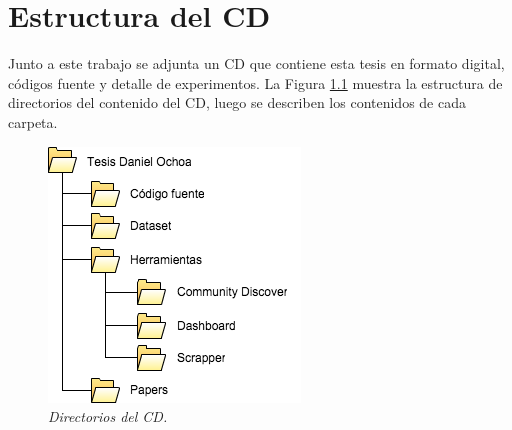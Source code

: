 
\chapter{Estructura del CD}

Junto a este trabajo se adjunta un CD que contiene esta tesis en formato digital, códigos fuente y detalle de experimentos. La Figura \ref{fig:apb-im1} muestra la estructura de directorios del contenido del CD, luego se describen los contenidos de cada carpeta.

\begin{figure}[H]
  \centering
  \includegraphics[scale=.5]{images/FiguraB-1}
  \caption{\em Directorios del CD.}
  \label{fig:apb-im1}
\end{figure}

